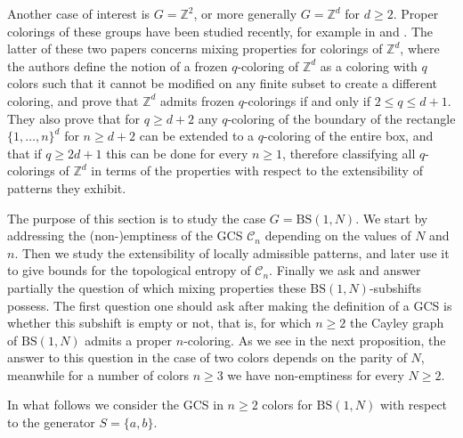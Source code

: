 \documentclass[letterpaper,10pt]{article}
\theoremstyle{plain}
\newcommand{\BS}[1][N]{\mathrm{BS}(1,#1)}
\begin{document}
Another case of interest is $G=\mathbb{Z}^2$, or more generally $G=\mathbb{Z}^d$ for $d\ge 2$. Proper colorings of these groups have been studied recently, for example in \cite{alon2019mixing} and \cite{peled2018rigidity}. The latter of these two papers concerns mixing properties for colorings of $\mathbb{Z}^d$, where the authors define the notion of a frozen $q$-coloring of $\mathbb{Z}^d$ as a coloring with $q$ colors such that it cannot be modified on any finite subset to create a different coloring, and prove that $\mathbb{Z}^d$ admits frozen $q$-colorings if and only if $2\le q\le d+1$. They also prove that for $q\ge d+2$ any $q$-coloring of the boundary of the rectangle $\{1,\ldots,n\}^d$ for $n\ge d+2$ can be extended to a $q$-coloring of the entire box, and that if $q\ge 2d+1$ this can be done for every $n\ge 1$, therefore classifying all $q$-colorings of $\mathbb{Z}^d$ in terms of the properties with respect to the extensibility of patterns they exhibit.


The purpose of this section is to study the case $G=\BS$. We start by addressing the (non-)emptiness of the GCS $\mathcal{C}_n$ depending on the values of $N$ and $n$. Then we study the extensibility of locally admissible patterns, and later use it to give bounds for the topological entropy of $\mathcal{C}_n$. Finally we ask and answer partially the question of which mixing properties these $\BS$-subshifts possess.
The first question one should ask after making the definition of a GCS is whether this subshift is empty or not, that is, for which $n\ge 2$ the Cayley graph of $\BS$ admits a proper $n$-coloring. As we see in the next proposition, the answer to this question in the case of two colors depends on the parity of $N$, meanwhile for a number of colors $n\ge 3$ we have non-emptiness for every $N\ge 2$.

In what follows we consider the GCS in $n\ge 2$ colors for $\BS$ with respect to the generator $S=\{a,b\}$.
\end{document}
